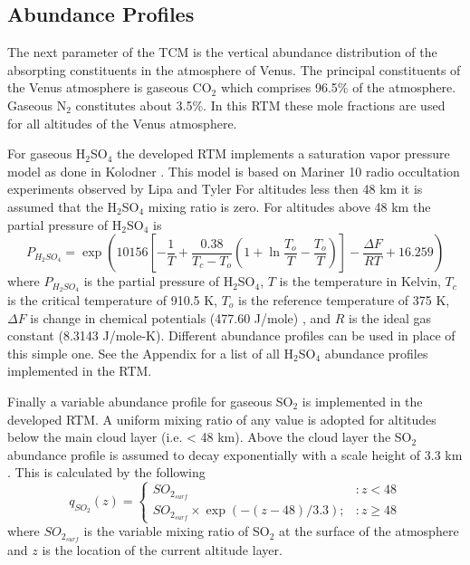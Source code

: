 \subsection{Abundance Profiles}
The next parameter of the TCM is the vertical abundance distribution of the absorpting constituents in the atmosphere of Venus. The principal constituents of the Venus atmosphere is gaseous CO$_2$ which comprises 96.5\% of the atmosphere. Gaseous N$_2$ constitutes about 3.5\%. In this RTM these mole fractions are used for all altitudes of the Venus atmosphere. 

For gaseous H$_2$SO$_4$ the developed RTM implements a saturation vapor pressure model as done in Kolodner \cite{Kolodner-thesis}. This model is based on Mariner 10 radio occultation experiments observed by Lipa and Tyler \cite{Lipa-1979} For altitudes less then 48 km it is assumed that the H$_2$SO$_4$ mixing ratio is zero. For altitudes above 48 km the partial pressure of H$_2$SO$_4$ is
\begin{equation}
P_{H_2SO_4} = \exp\left(10156\left[ -\frac{1}{T}+ \frac{0.38}{T_c-T_o}\left(1+\ln\frac{T_o}{T} - \frac{T_o}{T}\right) \right] - \frac{\Delta F}{R T} + 16.259 \right)
\end{equation}
where $P_{H_2SO_4}$ is the partial pressure of H$_2$SO$_4$, $T$ is the temperature in Kelvin, $T_c$ is the critical temperature of 910.5 K, $T_o$ is the reference temperature of 375 K, $\Delta F$ is change in chemical potentials (477.60 J/mole) \cite{Giauque-1960}, and $R$ is the ideal gas constant (8.3143 J/mole-K). Different abundance profiles can be used in place of this simple one. See the Appendix for a list of all H$_2$SO$_4$ abundance profiles implemented in the RTM.

Finally a variable abundance profile for gaseous SO$_2$ is implemented in the developed RTM. A uniform mixing ratio of any value is adopted for altitudes below the main cloud layer (i.e. < 48 km). Above the cloud layer the SO$_2$ abundance profile is assumed to decay exponentially with a scale height of 3.3 km \cite{Na-1994}. This is calculated by the following
\begin{equation}
q_{SO_2}(z) = \left\{
     \begin{array}{lr}
       SO_{2_{surf}} & : z < 48\\
       SO_{2_{surf}}\times\exp(-(z-48)/3.3); & : z\geq 48
     \end{array}
   \right.
\end{equation}
where $SO_{2_{surf}}$ is the variable mixing ratio of SO$_2$ at the surface of the atmosphere and $z$ is the location of the current altitude layer.


